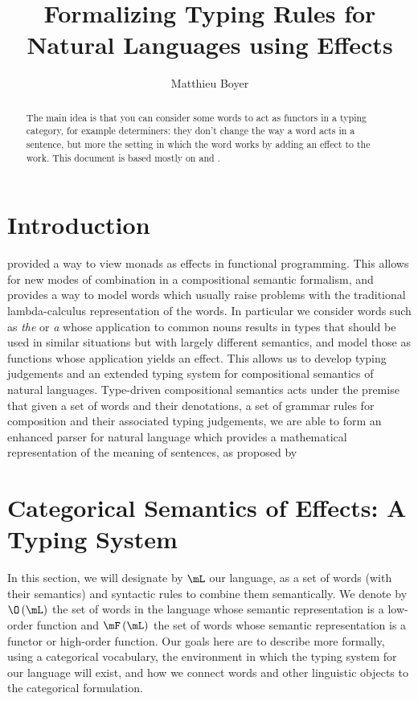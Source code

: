 \documentclass[math, english, info]{cours}
\title{Formalizing Typing Rules for Natural Languages using Effects}
\author{Matthieu Boyer}
\begin{document}
\bettertitle

\begin{abstract}
	The main idea is that you can consider some words to act as functors in a typing category, for example determiners:
	they don't change the way a word acts in a sentence,
	but more the setting in which the word works by adding an effect to the work.
	This document is based mostly on  and .
\end{abstract}

\section*{Introduction}
 provided a way to view monads as effects in functional programming.
This allows for new modes of combination in a compositional semantic formalism, and provides a way to model words which usually raise problems with the traditional lambda-calculus representation of the words.
In particular we consider words such as \textsl{the} or \textsl{a} whose application to common nouns results in types that should be used in similar situations but with largely different semantics, and model those as functions whose application yields an effect.
This allows us to develop typing judgements and an extended typing system for compositional semantics of natural languages.
Type-driven compositional semantics acts under the premise that given a set of words and their denotations, a set of grammar rules for composition and their associated typing judgements, we are able to form an enhanced parser for natural language which provides a mathematical representation of the meaning of sentences, as proposed by 

\section{Categorical Semantics of Effects: A Typing System}
\label{sec:typingsystem}
In this section, we will designate by $\mL$ our language, as a set of words (with their semantics) and syntactic rules to combine them semantically.
We denote by $\O\left( \mL \right)$ the set of words in the language whose semantic representation is a low-order function and $\mF\left( \mL \right)$ the set of words whose semantic representation is a functor or high-order function.
Our goals here are to describe more formally, using a categorical vocabulary, the environment in which the typing system for our language will exist, and how we connect words and other linguistic objects to the categorical formulation.
\end{document}
